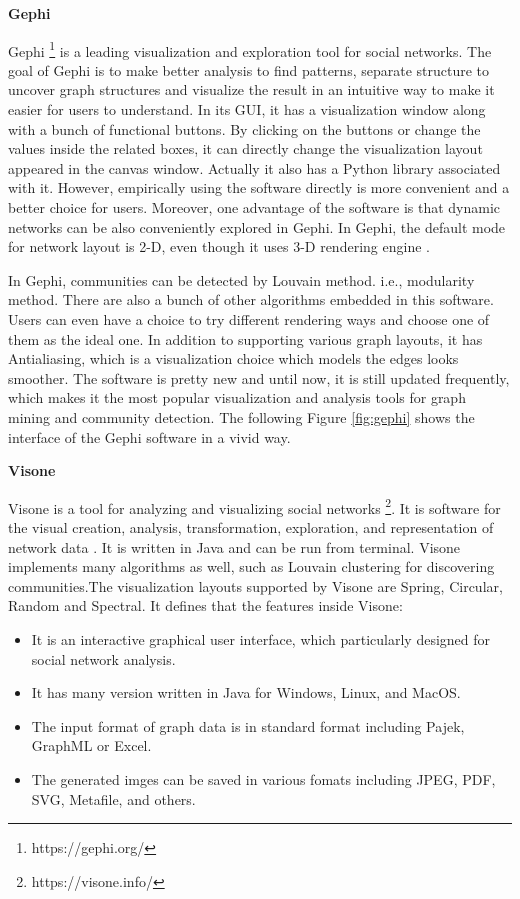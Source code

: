 \textbf{Gephi}

Gephi \footnote{https://gephi.org/} is a leading visualization and exploration tool for social networks. The goal of Gephi is to make better analysis to find patterns, separate structure to uncover graph structures and visualize the result in an intuitive way to make it easier for users to understand. In its GUI, it has a visualization window along with a bunch of functional buttons. By clicking on the buttons or change the values inside the related boxes, it can directly change the visualization layout appeared in the canvas window. Actually it also has a Python library associated with it. However, empirically using the software directly is more convenient and a better choice for users. Moreover, one advantage of the software is that dynamic networks can be also conveniently explored in Gephi. In Gephi, the default mode for network layout is 2-D, even though it uses 3-D rendering engine \cite{bastian2009gephi}.  

In Gephi, communities can be detected by Louvain method. i.e., modularity method. There are also a bunch of other algorithms embedded in this software. Users can even have a choice to try different rendering ways and choose one of them as the ideal one. In addition to supporting various graph layouts, it has Antialiasing, which is a visualization choice which models the edges looks smoother. The software is pretty new and until now, it is still updated frequently, which makes it the most popular visualization and analysis tools for graph mining and community detection. The following Figure \ref{fig:gephi} shows the interface of the Gephi software in a vivid way.


\textbf{Visone}

Visone \cite{baur2001visone} is a tool for analyzing and visualizing social networks \footnote{https://visone.info/}. It is software for the visual creation, analysis, transformation, exploration, and representation of network data \cite{brandes2004analysis}. It is written in Java and can be run from terminal.  Visone implements many algorithms as well, such as Louvain clustering for discovering communities.The visualization layouts supported by Visone are Spring, Circular, Random and Spectral. It defines that the features inside Visone:

\begin{itemize}
	\item It is an interactive graphical user interface, which particularly designed for social network analysis.
	\item It has many version written in Java for Windows, Linux, and MacOS.
	\item The input  format of graph data is in standard format including Pajek, GraphML or Excel.
	\item The generated imges can be saved in various fomats including JPEG, PDF, SVG, Metafile, and others.
\end{itemize}

